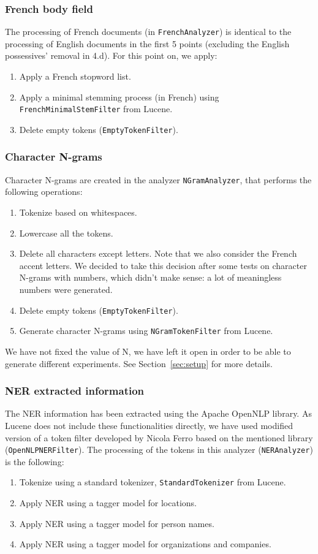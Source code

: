 \subsubsection{French body field}
The processing of French documents (in \texttt{FrenchAnalyzer}) is identical to the processing of English documents in
the first 5 points (excluding the English possessives' removal in 4.d).
For this point on, we apply:
\begin{enumerate}[start=6]
    \item Apply a French stopword list\cite{stopword_french}.
    \item Apply a minimal stemming process (in French) using \texttt{FrenchMinimalStemFilter} from Lucene.
    \item Delete empty tokens (\texttt{EmptyTokenFilter}).
\end{enumerate}

\subsubsection{Character N-grams}
Character N-grams are created in the analyzer \texttt{NGramAnalyzer}, that performs the following operations:
\begin{enumerate}
    \item Tokenize based on whitespaces.
    \item Lowercase all the tokens.
    \item Delete all characters except letters.
    Note that we also consider the French accent letters.
    We decided to take this decision after some tests on character N-grams with numbers, which didn't make sense: a lot of meaningless numbers were generated.
    \item Delete empty tokens (\texttt{EmptyTokenFilter}).
    \item Generate character N-grams using \texttt{NGramTokenFilter} from Lucene.
\end{enumerate}
We have not fixed the value of N, we have left it open in order to be able to generate different experiments.
See Section~\ref{sec:setup} for more details.

\subsubsection{NER extracted information}
The NER information has been extracted using the Apache OpenNLP\cite{ApacheOpenNLP} library.
As Lucene does not include these functionalities directly, we have used modified version of a token filter developed by
Nicola Ferro based on the mentioned library (\texttt{OpenNLPNERFilter}).
The processing of the tokens in this analyzer (\texttt{NERAnalyzer}) is the following:
\begin{enumerate}
    \item Tokenize using a standard tokenizer, \texttt{StandardTokenizer} from Lucene.
    \item Apply NER using a tagger model for locations.
    \item Apply NER using a tagger model for person names.
    \item Apply NER using a tagger model for organizations and companies.
\end{enumerate}

